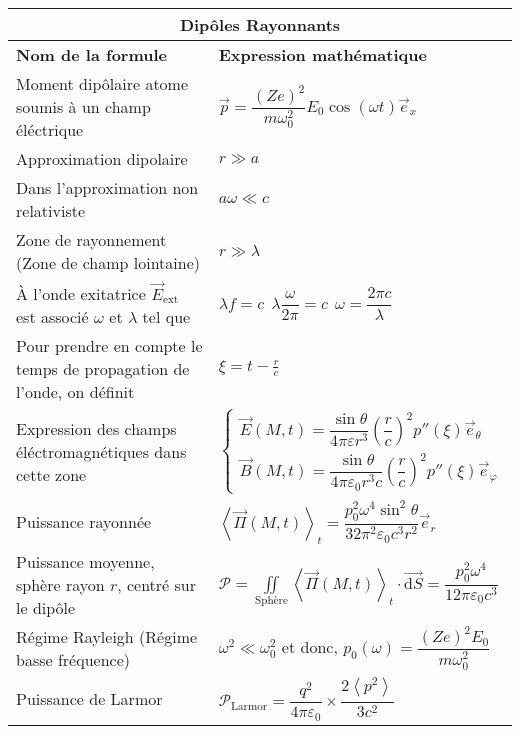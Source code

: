 \documentclass[10pt,a4paper,titlepage,portrait]{article}
\renewcommand{\d}
{
    \mathrm{d}
}
\renewcommand{\arraystretch}{2}
\newcommand{\av}[2]
{
    \left\langle#1\right\rangle_{#2}
}
\begin{document}
\begin{center}
\begin{table}[H]
    \centering
    \renewcommand{\arraystretch}{1.5} %
    \setlength{\tabcolsep}{8pt} %
    \begin{tabular}{@{}p{9cm}p{10cm}@{}}
        \toprule
        \multicolumn{2}{c}{\textbf{Dipôles Rayonnants}} \\
        \midrule
        \textbf{Nom de la formule} & \textbf{Expression mathématique} \\
        \midrule
        Moment dipôlaire atome soumis à un champ éléctrique & $\vec p = \dfrac{(Ze)^2}{m\omega_0^2}E_0\cos(\omega t)\vec e_x$ \\
        Approximation dipolaire & $r \gg a$ \\ 
        Dans l'approximation non relativiste & $a\omega \ll c$ \\
        Zone de rayonnement (Zone de champ lointaine) & $r \gg \lambda$ \\
        À l'onde exitatrice $\vec E_{\text{ext}}$ est associé $\omega$ et $\lambda$ tel que & $\lambda f = c \ \ \lambda\dfrac{\omega}{2\pi} = c \ \ \omega = \dfrac{2\pi c}{\lambda}$ \\
        Pour prendre en compte le temps de propagation de l'onde, on définit & $\xi = t - \frac{r}{c}$ \\
        Expression des champs éléctromagnétiques dans cette zone & $\left\{ \begin{array}{l} \vec E (M,t) = \dfrac{\sin \theta}{4\pi \varepsilon r^3} \left(\dfrac{r}{c}\right)^2 p''(\xi)\vec e_{\theta} \\ \vec B (M,t) = \dfrac{\sin \theta}{4\pi \varepsilon_0 r^3 c}\left(\dfrac{r}{c}\right)^2 p''(\xi) \vec e_{\varphi}\end{array}\right.$ \\
        Puissance rayonnée & $\av{\vec{\Pi} (M,t)}{t} = \dfrac{p_0^2 \omega^4 \sin^2 \theta}{32 \pi^2 \varepsilon_0 c^3 r^2}\vec e_r$ \\
        Puissance moyenne, sphère rayon $r$, centré sur le dipôle & $\displaystyle \mathcal{P} = \iint\limits_{\text{Sphère}} \av{\vec \Pi (M,t)}{t} \cdot \vec{\d S} = \dfrac{p_0^2 \omega^4}{12\pi \varepsilon_0 c^3}$ \\
        Régime Rayleigh (Régime basse fréquence) & $\omega^2 \ll \omega_0^2$ et donc, $p_0(\omega) = \dfrac{(Ze)^2E_0}{m\omega_0^2}$ \\
        Puissance de Larmor & $\mathcal P_{\text{Larmor}} = \dfrac{q^2}{4\pi \varepsilon_0} \times \dfrac{2\av{p^2}{}}{3c^2}$ \\



\end{tabular}
\end{table}
\end{center}
\end{document}
